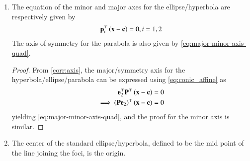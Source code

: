 \begin{enumerate}[label=\thesubsection.\arabic*.,ref=\thesubsection.\theenumi]
\begin{proof}
\begin{enumerate}
				\item 	For the standard ellipse/hyperbola, substituting from
\eqref{eq:c-ell-hyp},
\eqref{eq:n-ell-hyp},
\eqref{eq:std-prm-u}
and \eqref{eq:conic_quad_form_e}
in \eqref{eq:conic_quad_form_F},
				\begin{align}
					\vec{F} &= \pm \frac{\brak{\frac{1}{e\sqrt{1-e^2}}}\brak{e^2}\sqrt{\frac{\lambda_2}{f_0}}\vec{e}_1}{\frac{\lambda_2}{f_0}}
					\\
					&=
					\pm\sqrt{\abs{\frac{f_0}{\brak{1 - \frac{\lambda_1}{\lambda_2}}\frac{\lambda_1}{\lambda_2}}}}
					\brak{1 - \frac{\lambda_1}{\lambda_2}}\frac{\sqrt{\lambda_2}}{\lambda_2}\vec{e}_1
 			\end{align}
			yielding
					\eqref{eq:F-ell-hyp-parab}
					after simplification.
					For the standard parabola, substituting from 
\eqref{eq:c-parab},
\eqref{eq:n-parab},
\eqref{eq:std-prm-u}
and \eqref{eq:conic_quad_form_e}
in \eqref{eq:conic_quad_form_F},			
				\begin{align}
	\vec{F}  &= \frac{\brak{\frac{\eta}{4\sqrt{\lambda_2}}}\sqrt{\lambda_2}\vec{e}_1-\vec{\frac{\eta}{2} \vec{e}_1}}{\lambda_2}
\\
				\end{align}
				yielding 
					\eqref{eq:F-ell-hyp-parab} after simplification.

		\end{enumerate}
	\end{proof}
%
    \item The equation of the minor and major  axes for the ellipse/hyperbola are respectively given by 
  \begin{align}
\mathbf{p}_i^{\top}\left(\mathbf{x}-\mathbf{c}\right) = 0, i = 1,2
	  \label{eq:major-minor-axis-quad}
  \end{align}
  The axis of symmetry for the parabola is also given by 
	  \eqref{eq:major-minor-axis-quad}.

		\begin{proof}
From		\eqref{corr:axis}, the major/symmetry axis for the hyperbola/ellipse/parabola can be expressed using 
	\eqref{eq:conic_affine}
 as
  \begin{align}
	  \mathbf{e}_2^{\top}
		  \mathbf{P}^{\top}\left(\mathbf{x}-\mathbf{c}\right) &= 0
		  \\
	  \implies 		  \left(\mathbf{P}\mathbf{e}_2\right)^{\top}\left(\mathbf{x}-\mathbf{c}\right) &= 0
  \end{align}
yielding	  \eqref{eq:major-minor-axis-quad}, and the proof for the minor axis is similar.
		\end{proof}
	\item
			\label{corr:center}
			The center of the standard ellipse/hyperbola, defined to be the mid point of the line joining the foci, is the origin.
	

\end{enumerate}
